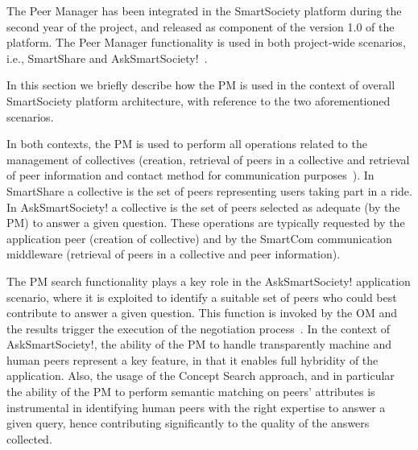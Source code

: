 The Peer Manager has been integrated in the SmartSociety platform
during the second year of the project, and released as component of
the version 1.0 of the platform. The Peer Manager functionality
is used in both project-wide scenarios, i.e., SmartShare and
AskSmartSociety!~\cite{D8.2,D8.3}.

In this section we briefly describe how the PM is used in the context
of overall SmartSociety platform architecture, with reference to the
two aforementioned scenarios.

In both contexts, the PM is used to perform all operations related to
the management of collectives
(creation, retrieval of peers in a collective and retrieval of peer
information and contact method for communication
purposes~\cite{D8.2}). In SmartShare a collective is the set of peers
representing users taking part in a ride. In AskSmartSociety! a
collective is the set of peers selected as adequate (by the PM) to
answer a given question. These operations are typically requested by
the application peer (creation of collective) and by the SmartCom
communication middleware (retrieval of peers in a collective and peer information).

The PM search functionality plays a key role in the AskSmartSociety!
application scenario, where it is exploited to identify a suitable set
of peers who could best contribute to answer a given
question. This function is invoked by the OM and the results trigger
the execution of the negotiation process~\cite{D8.2}. In the context
of AskSmartSociety!, the ability of
the PM to handle transparently machine and human peers represent a key
feature, in that it enables full hybridity of the application. Also, the usage of the Concept Search approach, and in
particular the ability of the PM to perform semantic matching on
peers' attributes is instrumental in identifying human peers with the
right expertise to answer a given query, hence contributing
significantly to the quality of the answers collected.
